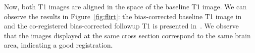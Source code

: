 \gobblepars
\begin{knitrout}
\color{fgcolor}\begin{kframe}
\begin{alltt}
\hlstd{(} \hlstd{=} \hlstd{,}
         \hlstd{=} \hlstd{,}
       \hlstd{=} \hlstd{,}
       \hlstd{=} \hlstd{,}
       \hlstd{=} \hlstd{,}
       \hlstd{=} \hlstd{)}
\end{alltt}
\end{kframe}
\end{knitrout}
\gobblepars


Now, both T1 images are aligned in the space of the baseline T1 image.  We can observe the results in Figure~\ref{fig:flirt}: the bias-corrected baseline T1 image in~\protect{} and the co-registered bias-corrected followup T1 is presented in~\protect{}.   We observe that the images displayed at the same cross section correspond to the same brain area, indicating a good registration.




